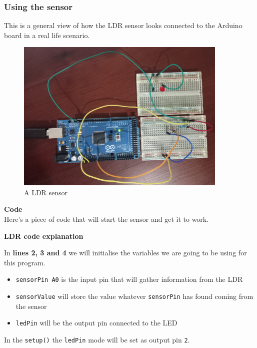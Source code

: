 \vspace{7mm}
\subsubsection{Using the sensor}

This is a general view of how the LDR sensor looks connected to the Arduino board in a real life scenario.

\begin{figure}[H]
    \centering
    \includegraphics[width=0.9\textwidth]{fig/ldr-circuit.jpg}
    \caption{A LDR sensor}
    \label{fig:ldr}
\end{figure}

\vspace{7mm}
\textbf{Code} \\

Here's a piece of code that will start the sensor and get it to work.


\textbf{LDR code explanation}

In \textbf{lines 2, 3 and 4} we will initialise the variables we are going to be using for this program.
\begin{itemize}
	\item \verb|sensorPin A0| is the input pin that will gather information from the LDR
	\item \verb|sensorValue| will store the value whatever \verb|sensorPin| has found coming from the sensor
	\item \verb|ledPin| will be the output pin connected to the LED
\end{itemize}

\vspace{5mm}
In the \verb|setup()| the \verb|ledPin| mode will be set as output pin \verb|2|.

